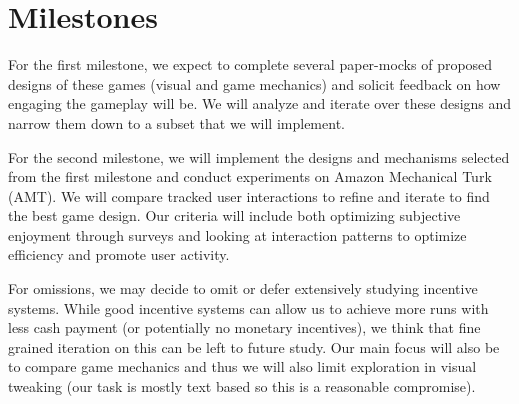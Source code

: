 \section{Milestones}





For the first milestone, we expect to complete several paper-mocks of proposed designs of these games (visual and game mechanics) and solicit feedback on how engaging the gameplay will be. We will analyze and iterate over these designs and narrow them down to a subset that we will implement.

For the second milestone, we will implement the designs and mechanisms selected from the first milestone and conduct experiments on Amazon Mechanical Turk (AMT). We will compare tracked user interactions to refine and iterate to find the best game design. Our criteria will include both optimizing subjective enjoyment through surveys and looking at interaction patterns to optimize efficiency and promote user activity.

For omissions, we may decide to omit or defer extensively studying incentive systems. While good incentive systems can allow us to achieve more runs with less cash payment (or potentially no monetary incentives), we think that fine grained iteration on this can be left to future study. Our main focus will also be to compare game mechanics and thus we will also limit exploration in visual tweaking (our task is mostly text based so this is a reasonable compromise).


